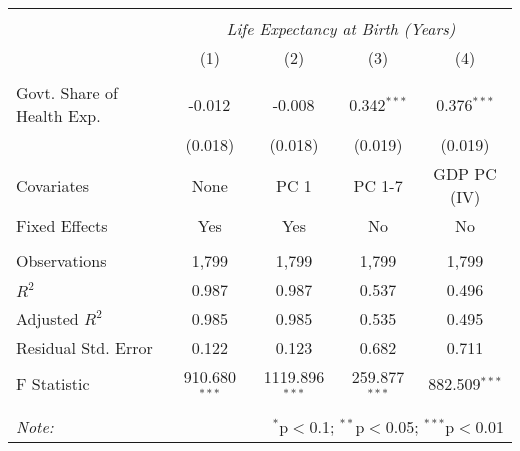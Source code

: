 \begin{table}[!htbp] \centering
\begin{tabular}{@{\extracolsep{5pt}}lcccc}
\\[-1.8ex]\hline
\hline \\[-1.8ex]
& \multicolumn{4}{c}{\textit{Life Expectancy at Birth (Years)}} \
\cr \
\\[-1.8ex] & (1) & (2) & (3) & (4) \\
\hline \\[-1.8ex]
 Govt. Share of Health Exp. & -0.012$^{}$ & -0.008$^{}$ & 0.342$^{***}$ & 0.376$^{***}$ \\
  & (0.018) & (0.018) & (0.019) & (0.019) \\
 Covariates & None & PC 1 & PC 1-7 & GDP PC (IV) \\
 Fixed Effects & Yes & Yes & No & No \\
\hline \\[-1.8ex]
 Observations & 1,799 & 1,799 & 1,799 & 1,799 \\
 $R^2$ & 0.987 & 0.987 & 0.537 & 0.496 \\
 Adjusted $R^2$ & 0.985 & 0.985 & 0.535 & 0.495 \\
 Residual Std. Error & 0.122 & 0.123 & 0.682 & 0.711  \\
 F Statistic & 910.680$^{***}$  & 1119.896$^{***}$  & 259.877$^{***}$  & 882.509$^{***}$  \\
\hline
\hline \\[-1.8ex]
\textit{Note:} & \multicolumn{4}{r}{$^{*}$p$<$0.1; $^{**}$p$<$0.05; $^{***}$p$<$0.01} \\
\end{tabular}
\end{table}